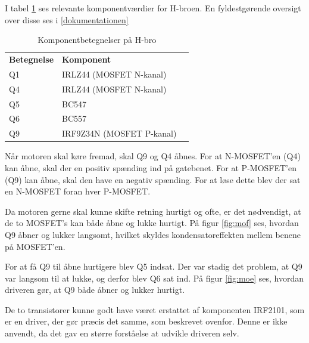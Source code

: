 I tabel \ref{hbrotabel} ses relevante komponentværdier for H-broen. En fyldestgørende oversigt over disse ses i \ref{dokumentationen}

\begin{table}[H]
	\centering
	\begin{tabular}{|l|l|l}
		\cline{1-2}
		\textbf{Betegnelse} & \textbf{Komponent}  	    &  \\ \cline{1-2}
		Q1   				& IRLZ44 (MOSFET N-kanal)  	&  \\ \cline{1-2}
		Q4   				& IRLZ44 (MOSFET N-kanal)	&  \\ \cline{1-2}
		Q5   				& BC547                     &  \\ \cline{1-2}
		Q6   				& BC557                     &  \\ \cline{1-2}
		Q9   				& IRF9Z34N (MOSFET P-kanal)	&  \\ \cline{1-2}
	\end{tabular}
	\caption{Komponentbetegnelser på H-bro}
	\label{hbrotabel}
\end{table}

Når motoren skal køre fremad, skal Q9 og Q4 åbnes. For at N-MOSFET'en (Q4) kan åbne, skal der en positiv spænding ind på gatebenet. For at P-MOSFET'en (Q9) kan åbne, skal den have en negativ spænding. For at løse dette blev der sat en N-MOSFET foran hver P-MOSFET.

Da motoren gerne skal kunne skifte retning hurtigt og ofte, er det nødvendigt, at de to MOSFET's kan både åbne og lukke hurtigt. På figur \ref{fig:mof} ses, hvordan Q9 åbner og lukker langsomt, hvilket skyldes kondensatoreffekten mellem benene på MOSFET'en.

For at få Q9 til åbne hurtigere blev Q5 indsat. Der var stadig det problem, at Q9 var langsom til at lukke, og derfor blev Q6 sat ind. På figur \ref{fig:moe} ses, hvordan driveren gør, at Q9 både åbner og lukker hurtigt.

De to transistorer kunne godt have været erstattet af komponenten IRF2101, som er en driver, der gør præcis det samme, som beskrevet ovenfor. Denne er ikke anvendt, da det gav en større forståelse at udvikle driveren selv. 

